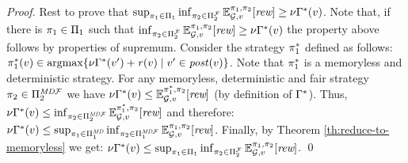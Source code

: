\begin{proof}
  Rest to prove that $\sup_{\pi_{1} \in \Pi_{1}}   \inf_{\pi_{2} \in \Pi^{\mathcal{F}}_{2}}  \mathbb{E}^{\pi_{1}, \pi_{2}}_{\mathcal{G},v}[\textit{rew}] \geq \nu \Gamma^*(v)$. Note that, if there is  $\pi_{1} \in \Pi_{1}$ such that
  $\inf_{\pi_{2} \in \Pi^{\mathcal{F}}_{2}}  \mathbb{E}^{\pi_{1}, \pi_{2}}_{\mathcal{G},v}[\textit{rew}] \geq \nu \Gamma^*(v)$ the property above follows by properties of supremum. Consider the strategy $\pi^*_{1}$ defined as follows:
  $\pi^*_{1}(v) \in \operatorname*{argmax} \{\nu \Gamma^*(v') + \mathit{r}(v) \mid v' \in \mathit{post}(v) \}$. Note that $\pi^*_{1}$ is a memoryless and deterministic strategy. For any memoryless, deterministic and fair strategy $\pi_{2} \in \Pi^{\textit{MD}\mathcal{F}}_{2}$ we have
  $\nu \Gamma^*(v) \leq \mathbb{E}^{\pi^*_{1}, \pi_{2}}_{\mathcal{G},v}[\textit{rew}]$ (by definition of $\Gamma^*$).  Thus,
  $\nu \Gamma^*(v) \leq \inf_{\pi_{2} \in \Pi^{\textit{MD}\mathcal{F}}_{2}} \mathbb{E}^{\pi^*_{1}, \pi_{2}}_{\mathcal{G},v}[\textit{rew}]$
  and therefore:
  $\nu \Gamma^*(v) \leq \sup_{\pi_{1} \in \Pi^{\textit{MD}}_{1}} \inf_{\pi_{2} \in \Pi^{\textit{MD}\mathcal{F}}_{1}} \mathbb{E}^{\pi_{1}, \pi_{2}}_{\mathcal{G},v}[\textit{rew}]$.
  Finally, by Theorem \ref{th:reduce-to-memoryless} we get:
  $\nu \Gamma^*(v) \leq \sup_{\pi_{1} \in \Pi_{1}} \inf_{\pi_{2} \in \Pi^{\mathcal{F}}_{2}} \mathbb{E}^{\pi_{1}, \pi_{2}}_{\mathcal{G},v}[\textit{rew}]$.
  \qed
\end{proof}
%
